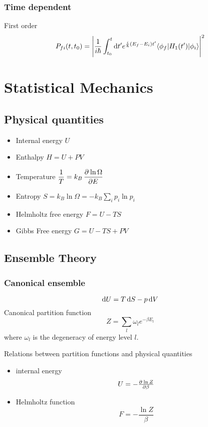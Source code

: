 \documentclass{article}
\newcommand{\ket}[1]{|#1\rangle}
\newcommand{\bra}[1]{\langle #1|}
\begin{document}
\subsubsection{Time dependent}
First order
\begin{equation}
\label{eq:1stTimeDependent}
P_{fi}(t,t_0)=\left|\frac{1}{i\hbar}\int_{t_0}^{t}\dif t^\prime
e^{\frac{i}{\hbar}(E_f-E_i)t^\prime}\bra{\phi_f}H_1(t^\prime)\ket{\phi_i}
\right|^2
\end{equation}

\section{Statistical Mechanics}
\subsection{Physical quantities}
\begin{itemize}
\item Internal energy $U$
\item Enthalpy $H=U+PV$
\item Temperature $\dfrac{1}{T}=k_B\dpd{\ln\Omega}{E}$
\item Entropy $S=k_B\ln\Omega=-k_B\sum_i{p_i\ln p_i}$
\item Helmholtz free energy $F=U-TS$
\item Gibbs Free energy $G=U-TS+PV$
\end{itemize}
\subsection{Ensemble Theory}
\subsubsection{Canonical ensemble}
$$\dif U = T\dif S -p\dif V$$
Canonical partition function
\begin{equation}
\label{eq:CanonicalPartitionFunction}
Z=\sum_{l}\omega_l e^{-\beta E_{l}}
\end{equation}
where $\omega_l$ is the degeneracy of energy level $l$.\par
Relations between partition functions and physical quantities
\begin{itemize}
\item internal energy $$U=-\pd{\ln Z}{\beta}$$
\item Helmholtz function $$F=-\frac{\ln Z}{\beta}$$
\end{itemize}
\end{document}
